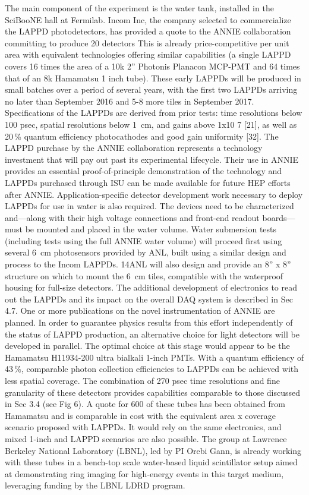 The main component of the experiment is the water tank, installed in the SciBooNE hall %
at Fermilab.
Incom Inc, the company selected to commercialize the LAPPD photodetectors, has provided a
quote to the ANNIE collaboration committing to produce 20 detectors
This is already price-competitive per unit area with equivalent
technologies offering similar capabilities (a single LAPPD covers 16 times the area of a 10k 2”
Photonis Planacon MCP-PMT and 64 times that of an 8k Hamamatsu 1 inch tube).
These early LAPPDs will be produced in small batches over a period of several years, %
with the first two LAPPDs arriving no later than September 2016 and 5-8 more tiles in September 2017.
Specifications of the LAPPDs are derived from prior tests: time resolutions below 100 psec, %
spatial resolutions below 1~cm, and gains above 1x10 7 [21], as well as 20\,\% quantum %
efficiency photocathodes and good gain uniformity [32].
The LAPPD purchase by the ANNIE collaboration represents a technology investment that will %
pay out past its experimental lifecycle.
Their use in ANNIE provides an essential proof-of-principle %
demonstration of the technology and LAPPDs purchased through ISU can be made available for %
future HEP efforts after ANNIE.
Application-specific detector development work necessary to deploy LAPPDs for use %
in water is also required.
The devices need to be characterized and—along with their high voltage connections %
and front-end readout boards—must be mounted and placed in the water volume.%
Water submersion tests (including tests using the full ANNIE water volume) will proceed %
first using several 6~cm photosensors provided by ANL, built using a similar design and %
process to the Incom LAPPDs.
14ANL will also design and provide an 8” x 8” structure on which to mount the 6~cm tiles, %
compatible with the waterproof housing for full-size detectors.
The additional development of electronics to read out the LAPPDs and its impact on the %
overall DAQ system is described in Sec 4.7.
One or more publications on the novel instrumentation of ANNIE are planned.
In order to guarantee physics results from this effort independently of the status of LAPPD %
production, an alternative choice for light detectors will be developed in parallel.
The optimal choice at this stage would appear to be the Hamamatsu H11934-200 ultra %
bialkali 1-inch PMTs.
With a quantum efficiency of 43\,\%, comparable photon collection efficiencies to %
LAPPDs can be achieved with less spatial coverage.
The combination of 270 psec time resolutions and fine granularity of these detectors %
provides capabilities comparable to those discussed in Sec 3.4 (see Fig 6).
A quote for 600 of these tubes has been obtained from Hamamatsu and is comparable in cost %
with the equivalent area x coverage scenario proposed with LAPPDs.
It would rely on the same electronics, and mixed 1-inch and LAPPD scenarios are also possible.
The group at Lawrence Berkeley National Laboratory (LBNL), led by PI Orebi Gann, %
is already working with these tubes in a bench-top scale water-based liquid %
scintillator setup aimed at demonstrating ring imaging for high-energy events in this target medium, %
leveraging funding by the LBNL LDRD program.

